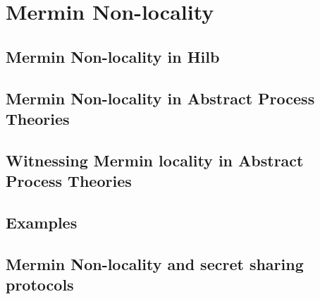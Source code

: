 \chapter{\color{blue} Mermin Non-locality}

\section{Mermin Non-locality in Hilb}

\section{Mermin Non-locality in Abstract Process Theories}

\section{Witnessing Mermin locality in Abstract Process Theories}

\section{Examples}

\section{Mermin Non-locality and secret sharing protocols}
